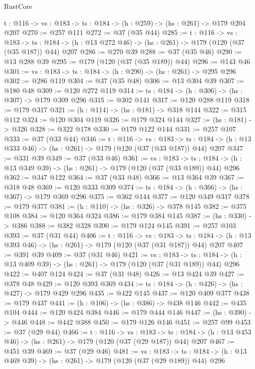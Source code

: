 \begin{lexlean}{RustCore}
\begin{coremodule}
  {t : @116} -> {vs : @183} -> {ts : @184} -> (h : @259) -> (hs : @261) -> @179 @204 @207
@270 := @257 @111
@272 := @37 (@35 @44)
@285 := {t : @116} ->
  {vs : @183} ->
  {ts : @184} -> (h : @13 @272 @46) -> (hs : @261) -> @179 (@120 (@37 (@35 @187)) @44) @207
@286 := @270 @39
@288 := @37 (@35 @46)
@290 := @13 @288 @39
@295 := @179 (@120 (@37 (@35 @189)) @44)
@296 := @143 @46
@301 := {vs : @183} -> {ts : @184} -> (h : @290) -> (hs : @261) -> @295 @296
@302 := @286 @119
@304 := @37 (@35 @48)
@306 := @13 @304 @39
@307 := @180 @48
@309 := @120 @272 @119
@314 := {ts : @184} -> (h : @306) -> (hs : @307) -> @179 @309 @296
@315 := @302 @141
@317 := @120 @288 @119
@318 := @179 @317
@321 := (h : @114) -> (hs : @181) -> @318 @144
@322 := @315 @112
@324 := @120 @304 @119
@326 := @179 @324 @144
@327 := (hs : @181) -> @326
@328 := @322 @178
@330 := @179 @122 @144
@331 := @257 @107
@333 := @37 (@33 @44)
@346 := {t : @116} ->
  {vs : @183} ->
  {ts : @184} -> (h : @13 @333 @46) -> (hs : @261) -> @179 (@120 (@37 (@33 @187)) @44) @207
@347 := @331 @39
@349 := @37 (@33 @46)
@361 := {vs : @183} ->
  {ts : @184} -> (h : @13 @349 @39) -> (hs : @261) -> @179 (@120 (@37 (@33 @189)) @44) @296
@362 := @347 @122
@364 := @37 (@33 @48)
@366 := @13 @364 @39
@367 := @318 @48
@369 := @120 @333 @309
@374 := {ts : @184} -> (h : @366) -> (hs : @367) -> @179 @369 @296
@375 := @362 @144
@377 := @120 @349 @317
@378 := @179 @377
@381 := (h : @110) -> (hs : @326) -> @378 @145
@382 := @375 @108
@384 := @120 @364 @324
@386 := @179 @384 @145
@387 := (hs : @330) -> @386
@388 := @382 @328
@390 := @179 @124 @145
@391 := @257 @103
@393 := @37 (@31 @44)
@406 := {t : @116} ->
  {vs : @183} ->
  {ts : @184} -> (h : @13 @393 @46) -> (hs : @261) -> @179 (@120 (@37 (@31 @187)) @44) @207
@407 := @391 @39
@409 := @37 (@31 @46)
@421 := {vs : @183} ->
  {ts : @184} -> (h : @13 @409 @39) -> (hs : @261) -> @179 (@120 (@37 (@31 @189)) @44) @296
@422 := @407 @124
@424 := @37 (@31 @48)
@426 := @13 @424 @39
@427 := @378 @48
@429 := @120 @393 @369
@434 := {ts : @184} -> (h : @426) -> (hs : @427) -> @179 @429 @296
@435 := @422 @145
@437 := @120 @409 @377
@438 := @179 @437
@441 := (h : @106) -> (hs : @386) -> @438 @146
@442 := @435 @104
@444 := @120 @424 @384
@446 := @179 @444 @146
@447 := (hs : @390) -> @446
@448 := @442 @388
@450 := @179 @126 @146
@451 := @257 @99
@453 := @37 (@29 @44)
@466 := {t : @116} ->
  {vs : @183} ->
  {ts : @184} -> (h : @13 @453 @46) -> (hs : @261) -> @179 (@120 (@37 (@29 @187)) @44) @207
@467 := @451 @39
@469 := @37 (@29 @46)
@481 := {vs : @183} ->
  {ts : @184} -> (h : @13 @469 @39) -> (hs : @261) -> @179 (@120 (@37 (@29 @189)) @44) @296

\end{coremodule}
\end{lexlean}
